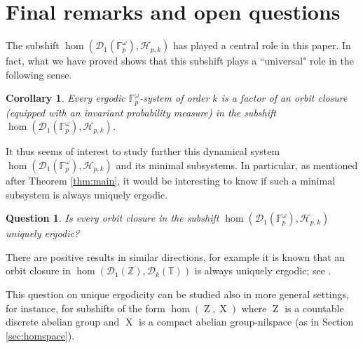\documentclass[a4paper,12pt,reqno]{amsart}
\newtheorem{corollary}[theorem]{Corollary}
\newtheorem{question}[theorem]{Question}
\theoremstyle{definition}
\newcommand{\mc}{\mathcal}
\newcommand{\mb}{\mathbb}
\DeclareMathOperator{\ab}{Z}
\DeclareMathOperator{\ns}{X}
\begin{document}
\section{Final remarks and open questions}

\noindent The subshift $\hom(\mc{D}_1(\mb{F}_p^\omega),\mc{H}_{p,k})$ has played a central role in this paper. In fact, what we have proved shows that this subshift plays a ``universal" role in the following sense.
\begin{corollary}
Every ergodic $\mb{F}_p^\omega$-system of order $k$ is a factor of an orbit closure \textup{(}equipped with an invariant probability measure\textup{)} in the subshift $\hom(\mc{D}_1(\mb{F}_p^\omega),\mc{H}_{p,k})$. 
\end{corollary}
\noindent It thus seems of interest to study further this dynamical system $\hom(\mc{D}_1(\mb{F}_p^\omega),\mc{H}_{p,k})$ and its minimal subsystems. In particular, as mentioned after Theorem \ref{thm:main}, it would be interesting to know if such a minimal subsystem is always uniquely ergodic. 
\begin{question}\label{Q:UniqueErgo}
Is every orbit closure in the subshift $\hom(\mc{D}_1(\mb{F}_p^\omega),\mc{H}_{p,k})$ uniquely ergodic?
\end{question}
\noindent There are positive results in similar directions, for example it is known that an orbit closure in $\hom(\mc{D}_1(\mb{Z}),\mc{D}_k(\mb{T}))$ is always uniquely ergodic; see \cite{Glasner,Salehi}.

This question on unique ergodicity can be studied also in more general settings, for instance, for subshifts of the form $\hom(\ab,\ns)$ where $\ab$ is a countable discrete abelian group and $\ns$ is a compact abelian group-nilspace (as in Section \ref{sec:homspace}). 
\end{document}
